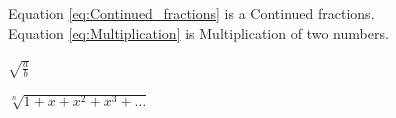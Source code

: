 Equation \ref{eq:Continued_fractions} is a Continued fractions.\\
Equation \ref{eq:Multiplication} is Multiplication of two numbers.


$\sqrt{\frac{a}{b}}$ %


$\sqrt[n]{1+x+x^2+x^3+\ldots}$           